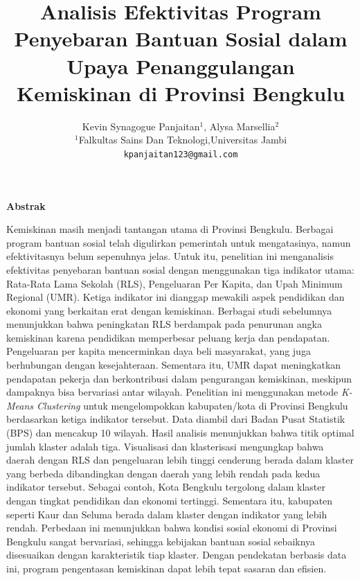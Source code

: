 \documentclass[12pt,a4paper]{article}
\begin{document}
\title{\textbf{Analisis Efektivitas Program Penyebaran Bantuan Sosial dalam Upaya Penanggulangan Kemiskinan di Provinsi Bengkulu}}
\author{
  Kevin Synagogue Panjaitan$^{1}$, Alysa Marsellia$^{2}$ \\
  $^1$Falkultas Sains Dan Teknologi,Universitas Jambi \\
  \texttt{kpanjaitan123@gmail.com}
}
\date{}
\maketitle

 \begin{center}
    \bfseries Abstrak
\end{center}
Kemiskinan masih menjadi tantangan utama di Provinsi Bengkulu. Berbagai program bantuan sosial telah digulirkan pemerintah untuk mengatasinya, namun efektivitasnya belum sepenuhnya jelas. Untuk itu, penelitian ini menganalisis efektivitas penyebaran bantuan sosial dengan menggunakan tiga indikator utama: Rata-Rata Lama Sekolah (RLS), Pengeluaran Per Kapita, dan Upah Minimum Regional (UMR). Ketiga indikator ini dianggap mewakili aspek pendidikan dan ekonomi yang berkaitan erat dengan kemiskinan. Berbagai studi sebelumnya menunjukkan bahwa peningkatan RLS berdampak pada penurunan angka kemiskinan karena pendidikan memperbesar peluang kerja dan pendapatan. Pengeluaran per kapita mencerminkan daya beli masyarakat, yang juga berhubungan dengan kesejahteraan. Sementara itu, UMR dapat meningkatkan pendapatan pekerja dan berkontribusi dalam pengurangan kemiskinan, meskipun dampaknya bisa bervariasi antar wilayah. Penelitian ini menggunakan metode \textit{K-Means Clustering} untuk mengelompokkan kabupaten/kota di Provinsi Bengkulu berdasarkan ketiga indikator tersebut. Data diambil dari Badan Pusat Statistik (BPS) dan mencakup 10 wilayah. Hasil analisis menunjukkan bahwa titik optimal jumlah klaster adalah tiga. Visualisasi dan klasterisasi mengungkap bahwa daerah dengan RLS dan pengeluaran lebih tinggi cenderung berada dalam klaster yang berbeda dibandingkan dengan daerah yang lebih rendah pada kedua indikator tersebut. Sebagai contoh, Kota Bengkulu tergolong dalam klaster dengan tingkat pendidikan dan ekonomi tertinggi. Sementara itu, kabupaten seperti Kaur dan Seluma berada dalam klaster dengan indikator yang lebih rendah. Perbedaan ini menunjukkan bahwa kondisi sosial ekonomi di Provinsi Bengkulu sangat bervariasi, sehingga kebijakan bantuan sosial sebaiknya disesuaikan dengan karakteristik tiap klaster. Dengan pendekatan berbasis data ini, program pengentasan kemiskinan dapat lebih tepat sasaran dan efisien.
  
\end{document}

